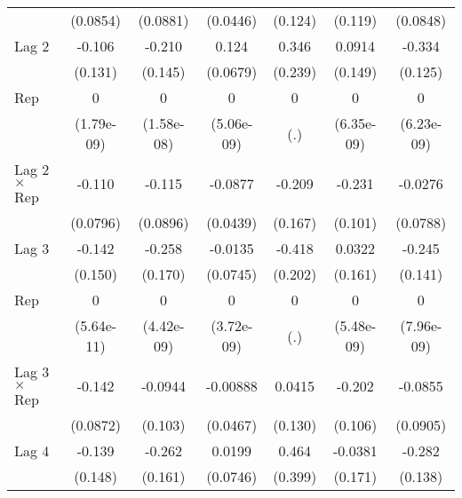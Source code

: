 \begin{table}[htbp]
\begin{tabular}{l*{6}{c}}
                & (0.0854)         & (0.0881)         & (0.0446)         &  (0.124)         &  (0.119)         & (0.0848)         \\
\addlinespace
Lag 2           &   -0.106         &   -0.210         &    0.124         &    0.346         &   0.0914         &   -0.334\sym{**} \\
                &  (0.131)         &  (0.145)         & (0.0679)         &  (0.239)         &  (0.149)         &  (0.125)         \\
\addlinespace
Rep             &        0         &        0         &        0         &        0         &        0         &        0         \\
                &(1.79e-09)         &(1.58e-08)         &(5.06e-09)         &      (.)         &(6.35e-09)         &(6.23e-09)         \\
\addlinespace
Lag 2 $\times$ Rep&   -0.110         &   -0.115         &  -0.0877\sym{*}  &   -0.209         &   -0.231\sym{*}  &  -0.0276         \\
                & (0.0796)         & (0.0896)         & (0.0439)         &  (0.167)         &  (0.101)         & (0.0788)         \\
\addlinespace
Lag 3           &   -0.142         &   -0.258         &  -0.0135         &   -0.418\sym{*}  &   0.0322         &   -0.245         \\
                &  (0.150)         &  (0.170)         & (0.0745)         &  (0.202)         &  (0.161)         &  (0.141)         \\
\addlinespace
Rep             &        0         &        0         &        0         &        0         &        0         &        0         \\
                &(5.64e-11)         &(4.42e-09)         &(3.72e-09)         &      (.)         &(5.48e-09)         &(7.96e-09)         \\
\addlinespace
Lag 3 $\times$ Rep&   -0.142         &  -0.0944         & -0.00888         &   0.0415         &   -0.202         &  -0.0855         \\
                & (0.0872)         &  (0.103)         & (0.0467)         &  (0.130)         &  (0.106)         & (0.0905)         \\
\addlinespace
Lag 4           &   -0.139         &   -0.262         &   0.0199         &    0.464         &  -0.0381         &   -0.282\sym{*}  \\
                &  (0.148)         &  (0.161)         & (0.0746)         &  (0.399)         &  (0.171)         &  (0.138)         \\

\end{tabular}
\end{table}
